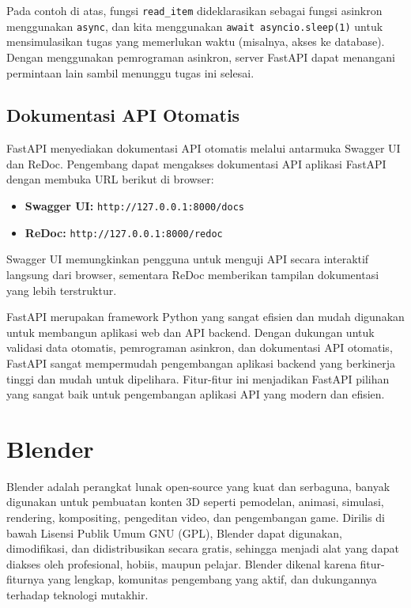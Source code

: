 Pada contoh di atas, fungsi \texttt{read\_item} dideklarasikan sebagai fungsi asinkron menggunakan \texttt{async}, dan kita menggunakan \texttt{await asyncio.sleep(1)} untuk mensimulasikan tugas yang memerlukan waktu (misalnya, akses ke database). Dengan menggunakan pemrograman asinkron, server FastAPI dapat menangani permintaan lain sambil menunggu tugas ini selesai.

\subsection{Dokumentasi API Otomatis}
FastAPI menyediakan dokumentasi API otomatis melalui antarmuka Swagger UI dan ReDoc. Pengembang dapat mengakses dokumentasi API aplikasi FastAPI dengan membuka URL berikut di browser:

\begin{itemize}
    \item \textbf{Swagger UI:} \texttt{http://127.0.0.1:8000/docs}
    \item \textbf{ReDoc:} \texttt{http://127.0.0.1:8000/redoc}
\end{itemize}

Swagger UI memungkinkan pengguna untuk menguji API secara interaktif langsung dari browser, sementara ReDoc memberikan tampilan dokumentasi yang lebih terstruktur.

FastAPI merupakan framework Python yang sangat efisien dan mudah digunakan untuk membangun aplikasi web dan API backend. Dengan dukungan untuk validasi data otomatis, pemrograman asinkron, dan dokumentasi API otomatis, FastAPI sangat mempermudah pengembangan aplikasi backend yang berkinerja tinggi dan mudah untuk dipelihara. Fitur-fitur ini menjadikan FastAPI pilihan yang sangat baik untuk pengembangan aplikasi API yang modern dan efisien.



\section{Blender}
Blender adalah perangkat lunak open-source yang kuat dan serbaguna, banyak digunakan untuk pembuatan konten 3D seperti pemodelan, animasi, simulasi, rendering, kompositing, pengeditan video, dan pengembangan game. Dirilis di bawah Lisensi Publik Umum GNU (GPL), Blender dapat digunakan, dimodifikasi, dan didistribusikan secara gratis, sehingga menjadi alat yang dapat diakses oleh profesional, hobiis, maupun pelajar. Blender dikenal karena fitur-fiturnya yang lengkap, komunitas pengembang yang aktif, dan dukungannya terhadap teknologi mutakhir.

